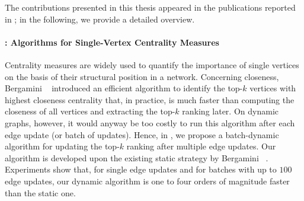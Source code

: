 The contributions presented in this thesis appeared in the publications
reported in ; in the following, we provide a detailed
overview.

\paragraph{: Algorithms for Single-Vertex
Centrality Measures}
%
Centrality measures are widely used to quantify the importance of single
vertices on the basis of their structural position in a network. Concerning closeness,
Bergamini \etal~\cite{DBLP:journals/tkdd/BergaminiBCMM19} introduced an
efficient algorithm to identify the top-$k$ vertices with highest closeness
centrality that, in practice, is much faster than computing the closeness of
all vertices and extracting the top-$k$ ranking later. On dynamic graphs, however, it
would anyway be too costly to run this algorithm after each edge update (or
batch of updates). Hence, in , we propose a batch-dynamic
algorithm for updating the top-$k$ ranking after multiple edge updates. Our algorithm
is developed upon the existing static strategy by Bergamini
\etal~\cite{DBLP:journals/tkdd/BergaminiBCMM19}. Experiments show that, for
single edge updates and for batches with up to $100$ edge updates, our dynamic
algorithm is one to four orders of magnitude faster than the static one.

